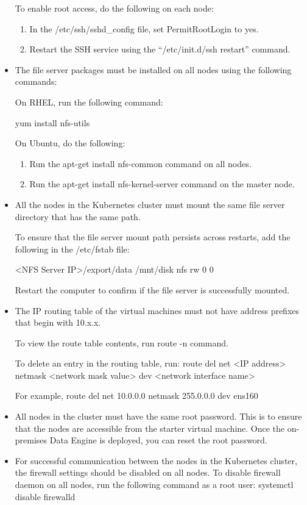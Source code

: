 \documentclass[letterpaper,10pt,english]{sphinxmanual}
\begin{document}
\begin{itemize}
To enable root access, do the following on each node:
\begin{enumerate}
\item {} 
In the /etc/ssh/sshd\_config file, set PermitRootLogin to yes.

\item {} 
Restart the SSH service using the “/etc/init.d/ssh restart” command.

\end{enumerate}

\item {} 
The file server packages must be installed on all nodes using the following commands:

On RHEL, run the following command:

yum install nfs-utils

On Ubuntu, do the following:
\begin{enumerate}
\item {} 
Run the apt-get install nfs-common command on all nodes.

\item {} 
Run the apt-get install nfs-kernel-server command on the master node.

\end{enumerate}

\item {} 
All the nodes in the Kubernetes cluster must mount the same file server directory that has the same path.

To ensure that the file server mount path persists across restarts, add the following in the /etc/fstab file:

\textless{}NFS Server IP\textgreater{}/export/data /mnt/disk nfs rw 0 0

Restart the computer to confirm if the file server is successfully mounted.

\item {} 
The IP routing table of the virtual machines must not have address prefixes that begin with 10.x.x.

To view the route table contents, run route -n command.

To delete an entry in the routing table, run:
route del \textendash{}net \textless{}IP address\textgreater{} netmask \textless{}network mask value\textgreater{} dev \textless{}network interface name\textgreater{}

For example, route del \textendash{}net 10.0.0.0 netmask 255.0.0.0 dev ens160

\item {} 
All nodes in the cluster must have the same root password. This is to ensure that the nodes are accessible from the starter virtual machine. Once the on-premises Data Engine is deployed, you can reset the root password.

\item {} 
For successful communication between the nodes in the Kubernetes cluster, the firewall settings should be disabled on all nodes.
To disable firewall daemon on all nodes, run the following command as a root user:
systemctl disable firewalld

\end{itemize}
\end{document}
